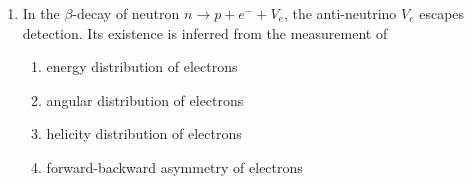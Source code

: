 \documentclass[journal]{IEEEtran}
\begin{document}
\begin{enumerate}
\begin{multicols}{4}
    \begin{enumerate}
        \item $\frac{1}{2}^-$
        \item $\frac{3}{2}^-$
        \item $\frac{3}{2}^+$
        \item $\frac{5}{2}^+$
    \end{enumerate}
\end{multicols}
\item In the $\beta$-decay of neutron $n\rightarrow p+e^-+V_e$, the anti-neutrino $V_e$ escapes detection. Its existence is inferred from the measurement of
\begin{enumerate}
    \item energy distribution of electrons
    \item angular distribution of electrons
    \item helicity distribution of electrons 
    \item forward-backward asymmetry of electrons
\end{enumerate}
\end{enumerate}
\end{document}
